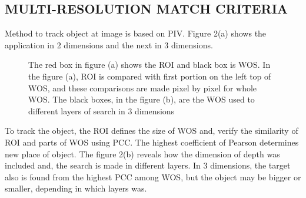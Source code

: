 
\subsection{MULTI-RESOLUTION MATCH CRITERIA}
Method to track object at image is based on PIV. Figure 2(a) shows the application 
in 2 dimensions and the next in
3 dimensions.

\begin{figure}[H]
\centering
  \caption{The red box in figure (a) shows the ROI and black box is WOS. In the figure (a), 
  ROI is compared with first portion on the left top of WOS, and these comparisons are made 
  pixel by pixel for whole WOS. The black boxes, in the figure (b), are the WOS used 
  to different layers of search in 3 dimensions}
\end{figure}

To track the object, the ROI defines the size of WOS and, verify the similarity 
of ROI and parts of WOS using PCC. 
The highest coefficient of Pearson determines new place of object. The figure 2(b) 
reveals how the dimension of depth was included and, 
the search is made in different layers. In 3 dimensions, the target also is found 
from the highest PCC among WOS, but the object may be 
bigger or smaller, depending in which layers was.\\
